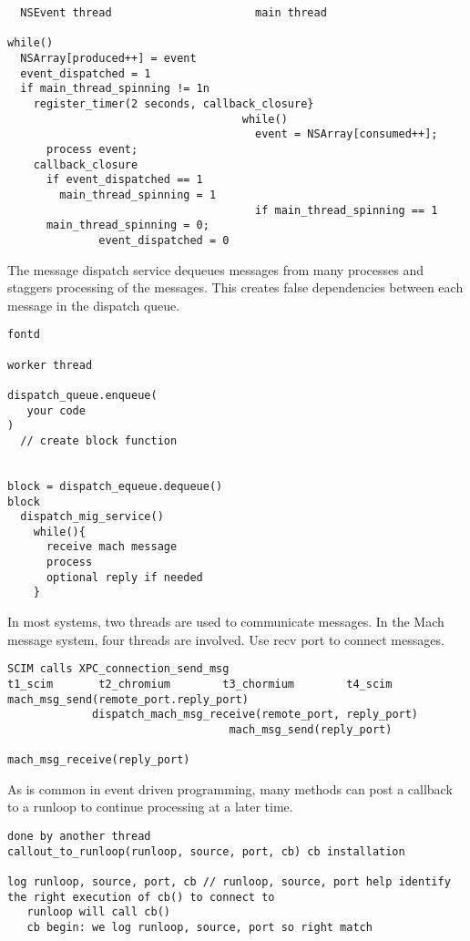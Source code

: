 {\footnotesize \begin{verbatim}
  NSEvent thread                      main thread

while()
  NSArray[produced++] = event
  event_dispatched = 1
  if main_thread_spinning != 1n
    register_timer(2 seconds, callback_closure}
                                    while()
                                      event = NSArray[consumed++];
      process event;
    callback_closure
      if event_dispatched == 1
        main_thread_spinning = 1
                                      if main_thread_spinning == 1
      main_thread_spinning = 0;
              event_dispatched = 0
\end{verbatim}
}

The message dispatch service dequeues messages from many processes and staggers
processing of the messages. This creates false dependencies between each
message in the dispatch queue.
{\footnotesize \begin{verbatim}
fontd

worker thread

dispatch_queue.enqueue(
   your code
)
  // create block function


block = dispatch_equeue.dequeue()
block
  dispatch_mig_service()
    while(){
      receive mach message
      process
      optional reply if needed
    }
\end{verbatim}
}

In most systems, two threads are used to communicate messages.
In the Mach message system, four threads are involved.
Use recv port to connect messages.

{\footnotesize \begin{verbatim}
SCIM calls XPC_connection_send_msg
t1_scim       t2_chromium        t3_chormium        t4_scim
mach_msg_send(remote_port.reply_port)
             dispatch_mach_msg_receive(remote_port, reply_port)
                                  mach_msg_send(reply_port)
                                                    mach_msg_receive(reply_port)
\end{verbatim}
}

As is common in event driven programming, many methods can post a callback to a runloop to continue processing at a later time.

{\footnotesize \begin{verbatim}
done by another thread
callout_to_runloop(runloop, source, port, cb) cb installation

log runloop, source, port, cb // runloop, source, port help identify
the right execution of cb() to connect to
   runloop will call cb()
   cb begin: we log runloop, source, port so right match
\end{verbatim}
}

